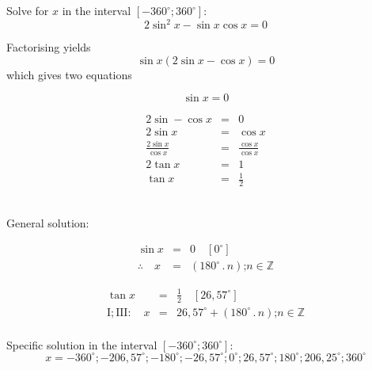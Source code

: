 \begin{wex}{}
{
Solve for $x$ in the interval $[-360^\circ;360^\circ]$:
\[2\sin^2x-\sin x \cos x = 0 \]
}%
{
Factorising yields
\[\sin x(2\sin x - \cos x) = 0\]
which gives two equations\\
\hspace*{-40pt}
\begin{minipage}{0.4\textwidth}
\[ \sin x = 0 \]
\[ \]
\[ \]
\[ \]
\end{minipage}
\hspace*{20pt}
\begin{minipage}{0.4\textwidth}
\begin{eqnarray*}
2\sin - \cos x &=& 0\\
2\sin x &=& \cos x \\
\frac{2\sin x}{\cos x} &=& \frac{\cos x}{\cos x} \\
2\tan x &=& 1 \\
\tan x &=& \tfrac{1}{2}
\end{eqnarray*}
\end{minipage}\\
General solution:\\
\hspace*{-60pt}
\begin{minipage}{0.4\textwidth}
\begin{eqnarray*}
 \sin x & = & 0 \quad [0^\circ]\\
\therefore \quad x &=& (180^\circ\,.\, n)\mbox{;} n\in\mathbb{Z}
\end{eqnarray*}
\end{minipage}
\hspace*{30pt}
\begin{minipage}{0.4\textwidth}
\begin{eqnarray*}
\tan x &=& \tfrac{1}{2} \quad [26,57^\circ]\\
\mathrm{I;III:} \quad x &=& 26,57^\circ +  (180^\circ\,.\, n)\mbox{;} n\in\mathbb{Z}\\
\end{eqnarray*}
\end{minipage}

Specific solution in the interval  $[-360^\circ;360^\circ]$:
\[ x = -360^\circ; -206,57^\circ; -180^\circ; -26,57^\circ; 0^\circ; 26,57^\circ; 180^\circ; 206,25^\circ; 360^\circ \]
}%
\end{wex}

